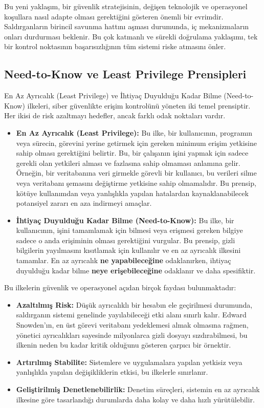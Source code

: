 Bu yeni yaklaşım, bir güvenlik stratejisinin, değişen teknolojik ve operasyonel koşullara nasıl adapte olması gerektiğini gösteren önemli bir evrimdir. Saldırganların birincil savunma hattını aşması durumunda, iç mekanizmaların onları durdurması beklenir. Bu çok katmanlı ve sürekli doğrulama yaklaşımı, tek bir kontrol noktasının başarısızlığının tüm sistemi riske atmasını önler.

\subsection{Need-to-Know ve Least Privilege Prensipleri}

En Az Ayrıcalık (Least Privilege) ve İhtiyaç Duyulduğu Kadar Bilme (Need-to-Know) ilkeleri, siber güvenlikte erişim kontrolünü yöneten iki temel prensiptir. Her ikisi de risk azaltmayı hedefler, ancak farklı odak noktaları vardır.

\begin{itemize}
    \item \textbf{En Az Ayrıcalık (Least Privilege):} Bu ilke, bir kullanıcının, programın veya sürecin, görevini yerine getirmek için gereken minimum erişim yetkisine sahip olması gerektiğini belirtir. Bu, bir çalışanın işini yapmak için sadece gerekli olan yetkileri alması ve fazlasına sahip olmaması anlamına gelir. Örneğin, bir veritabanına veri girmekle görevli bir kullanıcı, bu verileri silme veya veritabanı şemasını değiştirme yetkisine sahip olmamalıdır. Bu prensip, kötüye kullanımdan veya yanlışlıkla yapılan hatalardan kaynaklanabilecek potansiyel zararı en aza indirmeyi amaçlar.
    \item \textbf{İhtiyaç Duyulduğu Kadar Bilme (Need-to-Know):} Bu ilke, bir kullanıcının, işini tamamlamak için bilmesi veya erişmesi gereken bilgiye sadece o anda erişiminin olması gerektiğini vurgular. Bu prensip, gizli bilgilerin yayılmasını kısıtlamak için kullanılır ve en az ayrıcalık ilkesini tamamlar. En az ayrıcalık \textbf{ne yapabileceğine} odaklanırken, ihtiyaç duyulduğu kadar bilme \textbf{neye erişebileceğine} odaklanır ve daha spesifiktir.
\end{itemize}

Bu ilkelerin güvenlik ve operasyonel açıdan birçok faydası bulunmaktadır:
\begin{itemize}
    \item \textbf{Azaltılmış Risk:} Düşük ayrıcalıklı bir hesabın ele geçirilmesi durumunda, saldırganın sistemi genelinde yayılabileceği etki alanı sınırlı kalır. Edward Snowden'ın, en üst görevi veritabanı yedeklemesi almak olmasına rağmen, yönetici ayrıcalıkları sayesinde milyonlarca gizli dosyayı sızdırabilmesi, bu ilkenin neden bu kadar kritik olduğunu gösteren çarpıcı bir örnektir.
    \item \textbf{Artırılmış Stabilite:} Sistemlere ve uygulamalara yapılan yetkisiz veya yanlışlıkla yapılan değişikliklerin etkisi, bu ilkelerle sınırlanır.
    \item \textbf{Geliştirilmiş Denetlenebilirlik:} Denetim süreçleri, sistemin en az ayrıcalık ilkesine göre tasarlandığı durumlarda daha kolay ve daha hızlı yürütülebilir.
\end{itemize}

